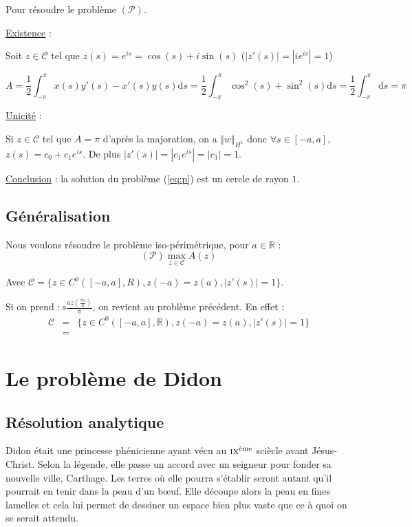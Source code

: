 \documentclass[10pt,a4paper]{article}
\newcommand{\R}{\mathbb{R}}
\renewcommand{\d}{\mathrm{d}}
\theoremstyle{plain}
\theoremstyle{definition}
\begin{document}
Pour résoudre le problème $(\mathcal{P})$.

\underline{Existence} :

Soit $z \in \mathcal{C}$ tel que $z(s)=e^{is} = \cos(s)+i\sin(s)$ ($|z'(s)|=|ie^{is}|=1$)

\[ A = \frac{1}{2} \int_{-\pi}^{\pi}{ x(s)y'(s) - x'(s)y(s) \d s } = \frac{1}{2} \int_{-\pi}^{\pi}{ \cos^2(s) + \sin^2(s) \d s } = \frac{1}{2} \int_{-\pi}^{\pi}{ \d s } = \pi \]

\underline{Unicité} :

Si $z \in \mathcal{C}$ tel que $A=\pi$ d'après la majoration, on a $\Vert w\Vert_{H^1}$ donc $\forall s\in [-a,a]$, $z(s) = c_0+c_1e^{is}$. De plus $|z'(s)|=|c_1e^{is}| = |c_1| = 1$.


\underline{Conclusion} : la solution du problème (\ref{eq:p}) est un cercle de rayon $1$. 

\subsection{Généralisation}

Nous voulons résoudre le problème iso-périmétrique, pour $a\in \R$ :
\[ (\mathcal{P}) \max_{z \in \mathcal{C}} A(z) \]

Avec $\mathcal{C} = \{ z \in C^0([-a,a], R), z(-a)=z(a), |z'(s)|=1 \}$.

Si on prend $ : s\frac{a z(\frac{\pi s}{a})}{\pi}$, on revient au problème précédent. En effet :
\begin{eqnarray}
\mathcal{C} &=& \{ z \in C^0([-a,a], \R), z(-a)=z(a), |z'(s)|=1 \} \\
&=& 
\end{eqnarray}

\section{Le problème de Didon}
\label{sec:didon}

\subsection{Résolution analytique}

Didon était une princesse phénicienne ayant vécu au $\textsc{ix}^\text{ème}$ sciècle avant Jésus-Christ. Selon la légende, elle passe un accord avec un seigneur pour fonder sa nouvelle ville, Carthage. Les terres où elle pourra s'établir seront \og autant qu'il pourrait en tenir dans la peau d'un b\oe{}uf\fg{}. Elle découpe alors la peau en fines lamelles et cela lui permet de dessiner un espace bien plus vaste que ce à quoi on se serait attendu.
\end{document}
